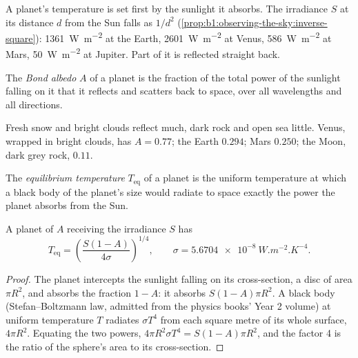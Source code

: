 A planet's temperature is set first by the sunlight it absorbs. The
irradiance $S$ at its distance $d$ from the Sun falls as $1/d^2$
(\cref{prop:b1:observing-the-sky:inverse-square}): \qty{1361}{W.m^{-2}} at
the Earth, \qty{2601}{W.m^{-2}} at Venus, \qty{586}{W.m^{-2}} at Mars,
\qty{50}{W.m^{-2}} at Jupiter. Part of it is reflected straight back.

\begin{definition}\label{def:b1:comparative-planetology:albedo}
The \emph{Bond albedo} $A$ of a planet is the fraction
of the total power of the sunlight falling on it that it reflects and
scatters back to space, over all wavelengths and all directions.
\end{definition}

Fresh snow and bright clouds reflect much, dark rock and open sea little.
Venus, wrapped in bright clouds, has $A = 0.77$; the Earth $0.294$; Mars
$0.250$; the Moon, dark grey rock, $0.11$.

\begin{definition}\label{def:b1:comparative-planetology:equilibrium-temperature}
The \emph{equilibrium temperature} $T_\mathrm{eq}$
of a planet is the uniform temperature at which a black body of the
planet's size would radiate to space exactly the power the planet absorbs
from the Sun.
\end{definition}

\begin{proposition}\label{prop:b1:comparative-planetology:teq}
A planet of  $A$ receiving the irradiance $S$ has
\[
  T_\mathrm{eq} = \left(\frac{S(1 - A)}{4\sigma}\right)^{1/4},
  \qquad \sigma = \qty{5.6704e-8}{W.m^{-2}.K^{-4}} .
\]
\end{proposition}

\begin{proof}
The planet intercepts the sunlight falling on its cross-section, a disc of
area $\pi R^2$, and absorbs the fraction $1 - A$: it absorbs $S(1 - A)\pi
R^2$. A black body (Stefan--Boltzmann law, admitted from the physics books'
Year 2 volume) at uniform temperature $T$ radiates $\sigma T^4$ from each
square metre of its whole surface, $4\pi R^2$. Equating the two powers,
$4\pi R^2\sigma T^4 = S(1 - A)\pi R^2$, and the factor 4 is the ratio of
the sphere's area to its cross-section.
\end{proof}

